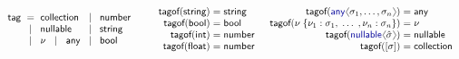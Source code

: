 \documentclass[10pt,nocopyrightspace]{sigplanconf}
\newcommand{\langl}{\begin{picture}(4.5,7)
\put(1.1,2.5){\rotatebox{60}{\line(1,0){5.5}}}
\put(1.1,2.5){\rotatebox{300}{\line(1,0){5.5}}}
\end{picture}}
\newcommand{\rangl}{\begin{picture}(4.5,7)
\put(.9,2.5){\rotatebox{120}{\line(1,0){5.5}}}
\put(.9,2.5){\rotatebox{240}{\line(1,0){5.5}}}
\end{picture}}
\newcommand{\kvd}[1]{\textnormal{\textcolor{kvdclr}{\sffamily #1}}}
\newcommand{\ident}[1]{\textnormal{\sffamily #1}}
\newcommand{\lsep}[0]{\;\; | \;\;}
\newcommand{\narrow}[1]{\hspace{-0.7em} #1 \hspace{-0.7em}}
\newcommand{\tytag}{\ident{tag}}
\newcommand{\tytagof}{\ident{tagof}}
\begin{document}
\begin{figure*}
  \noindent
  \begin{equation*}
  \begin{array}{rclcl}
   \tytag &\narrow{=}& \ident{collection}  &\narrow{\lsep}& \ident{number} \\
          &\narrow{\lsep}& \ident{nullable} &\narrow{\lsep}& \ident{string}  \\
          &\narrow{\lsep}& \nu ~\lsep \ident{any} &\narrow{\lsep}& \ident{bool}
  \end{array}
\quad\;\;\;
\begin{array}{rcl}
   \tytagof(\ident{string}) &\narrow{=}& \ident{string}\\
   \tytagof(\ident{bool}) &\narrow{=}& \ident{bool}\\
   \tytagof(\ident{int}) &\narrow{=}& \ident{number}\\
   \tytagof(\ident{float}) &\narrow{=}& \ident{number}\\
  \end{array}
\;\;
\begin{array}{rcl}
   \tytagof(\kvd{any}\langl\sigma_1, \ldots, \sigma_n\rangl) &\narrow{=}& \ident{any}\\
   \tytagof(\nu\; \{ \nu_1 : \sigma_1, \; \ldots \; , \nu_n : \sigma_n \}) &\narrow{=}& \nu \\
   \tytagof(\kvd{nullable}\langl\hat{\sigma}\rangl) &\narrow{=}& \ident{nullable}\\
   \tytagof([\sigma]) &\narrow{=}& \ident{collection}\\
  \end{array}
  \end{equation*}

  \vspace{-0.5em}


\end{figure*}
\end{document}
